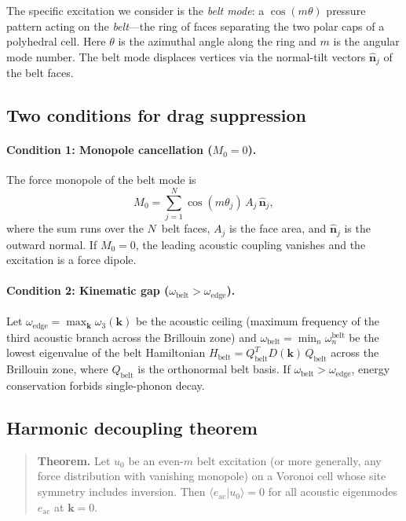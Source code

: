 \documentclass[12pt]{article}
\newcommand{\vk}{\bm{k}}
\newcommand{\vn}{\hat{\bm{n}}}
\newcommand{\oedge}{\omega_{\mathrm{edge}}}
\newcommand{\obelt}{\omega_{\mathrm{belt}}}
\begin{document}
The specific excitation we consider is the \emph{belt mode}: a
$\cos(m\theta)$ pressure pattern acting on the \emph{belt}---the ring
of faces separating the two polar caps of a polyhedral cell.  Here
$\theta$ is the azimuthal angle along the ring and $m$ is the angular
mode number.  The belt mode displaces
vertices via the normal-tilt vectors $\vn_j$ of the belt faces.

\subsection{Two conditions for drag suppression}
\label{sec:conditions}

\paragraph{Condition 1: Monopole cancellation ($M_0 = 0$).}
The force monopole of the belt mode is
\begin{equation}
  M_0 = \sum_{j=1}^{N} \cos(m\theta_j)\, A_j\, \vn_j,
  \label{eq:M0}
\end{equation}
where the sum runs over the $N$~belt faces, $A_j$ is the face area,
and $\vn_j$ is the outward normal.  If $M_0 = 0$, the leading
acoustic coupling vanishes and the excitation is a force dipole.

\paragraph{Condition 2: Kinematic gap ($\obelt > \oedge$).}
Let $\oedge = \max_{\vk} \omega_3(\vk)$ be the acoustic ceiling
(maximum frequency of the third acoustic branch across the Brillouin
zone) and $\obelt = \min_n \omega_n^{\mathrm{belt}}$ be the lowest
eigenvalue of the belt Hamiltonian $H_{\mathrm{belt}} = Q_{\mathrm{belt}}^T
D(\vk)\, Q_{\mathrm{belt}}$ across the Brillouin zone, where
$Q_{\mathrm{belt}}$ is the orthonormal belt basis.  If $\obelt >
\oedge$, energy conservation forbids single-phonon decay.

\subsection{Harmonic decoupling theorem}
\label{sec:theorem}

\begin{quote}
\textbf{Theorem.}  Let $u_0$ be an even-$m$ belt excitation (or more
generally, any force distribution with vanishing monopole) on a
Voronoi cell whose site symmetry includes inversion.  Then $\langle
e_{\mathrm{ac}} | u_0 \rangle = 0$ for all acoustic eigenmodes
$e_{\mathrm{ac}}$ at $\vk = 0$.
\end{quote}
\end{document}
